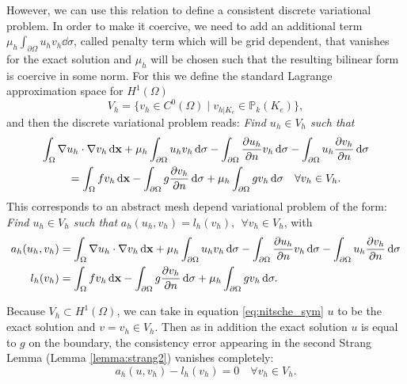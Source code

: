 However, we can use this relation to define a consistent discrete variational problem. In order to make it coercive, we need to add an additional term $\mu_h \int_{\partial \Omega} u_h v_h \dd \sigma$, called penalty term which will be grid dependent, that vanishes for the exact solution and $\mu_h$ will be chosen such that the resulting bilinear form is coercive in some norm. 
For this we define the standard Lagrange approximation space for $H^1(\Omega)$
$$V_h=\{ v_h\in C^0(\Omega) \;|\; v_{h|K_e}\in \mathbb{P}_k(K_e)\},$$
and then the discrete variational problem reads: \emph{Find $u_h\in V_h$ such that}
\begin{multline*}
\int_\Omega \nabla u_h \cdot \nabla v_h \,{\rm d} \mathbf{x} +\mu_h\int_{\partial \Omega} u_h v_h \,{\rm d} \sigma
- \int_{\partial \Omega} \frac{\partial u_h}{\partial n} v_h \,{\rm d} \sigma -\int_{\partial \Omega} u_h \frac{\partial v_h}{\partial n} \,{\rm d} \sigma \\ =
 \int_\Omega f v_h  \,{\rm d} \mathbf{x} -\int_{\partial \Omega} g \frac{\partial v_h}{\partial n}\,{\rm d}\sigma +\mu_h \int_{\partial \Omega} g v_h\,{\rm d}\sigma \quad\forall v_h\in V_h.
\end{multline*}
This corresponds to an abstract mesh depend variational problem of the form:\\
 \emph{Find $u_h\in V_h$ such that}
$a_h(u_h,v_h)=l_h(v_h), ~~\forall v_h\in V_h$, with
\begin{align*}
a_h(u_h,v_h) &= \int_\Omega \nabla u_h \cdot \nabla v_h \,{\rm d} \mathbf{x} +\mu_h\int_{\partial \Omega} u_h v_h \,{\rm d} \sigma
- \int_{\partial \Omega} \frac{\partial u_h}{\partial n} v_h \,{\rm d} \sigma -\int_{\partial \Omega} u_h \frac{\partial v_h}{\partial n} \,{\rm d} \sigma \\
l_h(v_h) &=  \int_\Omega f v_h  \,{\rm d} \mathbf{x} -\int_{\partial \Omega} g \frac{\partial v_h}{\partial n}\,{\rm d}\sigma
+\mu_h \int_{\partial \Omega} g v_h\,{\rm d}\sigma.
\end{align*}

Because $V_h\subset H^1(\Omega)$, we can take in equation \eqref{eq:nitsche_sym} $u$ to be the exact solution and $v=v_h\in V_h$. Then as in addition the exact solution $u$ is equal to $g$ on the boundary, the consistency error appearing in the second Strang Lemma (Lemma \ref{lemma:strang2}) vanishes completely:
$$a_h(u,v_h) - l_h(v_h) = 0 \quad\forall v_h\in V_h.$$

